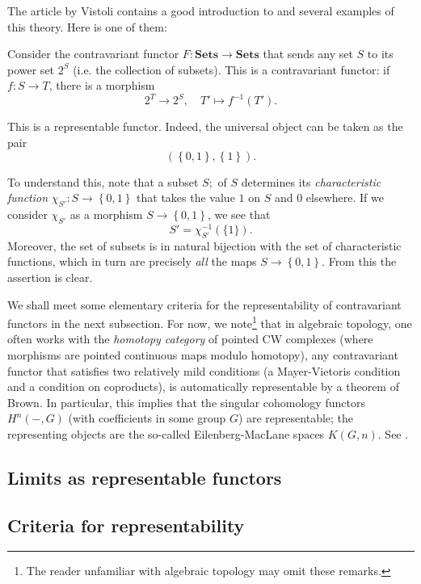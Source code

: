 The article \cite{Vi08} by Vistoli contains a good introduction to and several
examples of this theory.
Here is one of them:

\begin{example}
Consider the contravariant functor $F: \mathbf{Sets} \to \mathbf{Sets}$ that
sends any set $S$ to its power set $2^S$ (i.e. the collection of subsets).
This is a contravariant functor: if $f: S \to T$, there is a morphism
\[ 2^T \to 2^S, \quad T' \mapsto f^{-1}(T').  \]

This is a representable functor. Indeed, the universal object can be taken as
the pair
\[ ( \left\{0,1\right\}, \left\{1\right\}).  \]

To understand this, note that a subset $S;$ of $S$ determines its
\emph{characteristic function} $\chi_{S'}: S \to \left\{0,1\right\}$ that
takes the value $1$ on $S$ and $0$ elsewhere.
If we consider $\chi_{S'}$ as a morphism $ S \to \left\{0,1\right\}$, we see
that
\[ S' = \chi_{S'}^{-1}(\{1\}).  \]
Moreover, the set of subsets is in natural bijection with the set of
characteristic functions, which in turn are precisely \emph{all} the maps $S
\to \left\{0,1\right\}$. From this the assertion is clear.
\end{example}

We shall meet some elementary criteria for the representability of
contravariant functors in the next subsection. For now, we note\footnote{The
reader unfamiliar with algebraic topology may omit these remarks.} that in
algebraic topology, one often works with the \emph{homotopy category} of
pointed CW complexes (where morphisms are pointed continuous maps modulo
homotopy), any contravariant functor that satisfies two relatively mild
conditions (a
Mayer-Vietoris condition and a condition on coproducts), is automatically
representable by a theorem of Brown. In particular, this implies that the
singular cohomology functors $H^n(-, G)$ (with coefficients in some group $G$)
are representable; the representing objects are the so-called
Eilenberg-MacLane spaces  $K(G,n)$.  See \cite{Ha02}.


\subsection{Limits as representable functors}

\add{}

\subsection{Criteria for representability}

